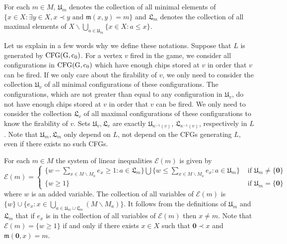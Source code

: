 \documentclass{article}
\theoremstyle{definition}
\newcommand\down[1]{e_{#1}}
\newcommand\set[1]{\{ #1 \}}
\begin{document}
For each $m \in M$, $\mathfrak{U}_m$ denotes the collection of all minimal elements of $\set{x \in X: \exists y \in X, x \prec y \text{ and } \mathfrak{m}(x,y)=m}$ and $\mathfrak{L}_m$ denotes the collection of all maximal elements of $X\backslash \underset{a \in \mathfrak{U}_m}{\bigcup} \set{x \in X: a\leq x}$. 

Let us explain in a few words why we define these notations. Suppose that $L$ is generated by ${\rm CFG(G,c_0)}$. For a vertex $v$ fired in the game, we consider all configurations in ${\rm CFG(G,c_0)}$ which have enough chips stored at $v$ in order that $v$ can be fired. If we only care about the firability of $v$, we only need to consider the collection $\mathfrak{U}_v$ of all  minimal configurations of these configurations. The configurations, which are not greater than equal to any configuration in $\mathfrak{U}_v$, do not have enough chips stored at $v$ in order that $v$ can be fired. We only need to consider the collection $\mathfrak{L}_v$ of all maximal configurations of these configurations to know the firability of $v$. Sets $\mathfrak{U}_{v},\mathfrak{L}_v$ are exactly $\mathfrak{U}_{\kappa^{-1}(v)}$, $\mathfrak{L}_{\kappa^{-1}(v)}$, respectively in $L$. Note that $\mathfrak{U}_m,\mathfrak{L}_m$ only depend on $L$, not depend on the CFGs generating $L$, even if there exists no such CFGs. 

For each $m \in M$ the system of linear inequalities $\mathcal{E}(m)$ is given by
$$
\mathcal{E}(m)=
\begin{cases}
\set{w-\underset{x \in M\backslash M_a}{\sum} \down{x}\geq 1: a \in \mathfrak{L}_m}\bigcup \set{w\leq \underset{x \in M\backslash M_a}{\sum}\down{x} : a \in \mathfrak{U}_m}&\text{ if }\mathfrak{U}_m\neq \set{\textbf{0}}\\
\set{w\geq 1}&\text{ if }\mathfrak{U}_m=\set{\textbf{0}}
\end{cases}
$$
where $w$ is an added variable. The collection of all variables of $\mathcal{E}(m)$ is $\set{w}\cup \set{\down{x}: x \in \underset{a\in \mathfrak{U}_m\cup \mathfrak{L}_m}{\bigcup}(M\backslash M_a)}$. It follows from the definitions of $\mathfrak{U}_m$ and $\mathfrak{L}_m$ that if $\down{x}$ is in the collection of all variables of $\mathcal{E}(m)$ then $x \neq m$. Note that $\mathcal{E}(m)=\set{w \geq 1}$ if and only if there exists $x \in X$ such that $\textbf{0} \prec x$ and $\mathfrak{m}(\textbf{0},x)=m$.
\end{document}
